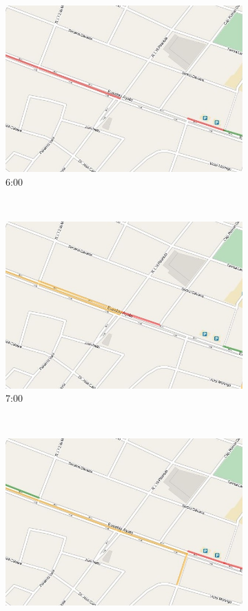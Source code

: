 \begin{figure}[!htbp]
	\centering
	\begin{subfigure}[b]{0.30\textwidth}
		\includegraphics[width=\textwidth]{capitulos/7/figuras/6.jpg}
		\caption{6:00}
	\end{subfigure}
	~~
	\begin{subfigure}[b]{0.30\textwidth}
		\includegraphics[width=\textwidth]{capitulos/7/figuras/7.jpg}
		\caption{7:00}		
	\end{subfigure}
	~~
	\begin{subfigure}[b]{0.30\textwidth}
		\includegraphics[width=\textwidth]{capitulos/7/figuras/8.jpg}

\end{subfigure}
\end{figure}
